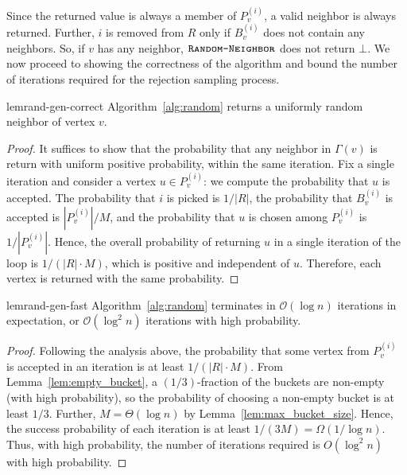 Since the returned value is always a member of $P_v^{(i)}$,
a valid neighbor is always returned.
Further, $i$ is removed from $R$ only if $B_v^{(i)}$ does not contain any neighbors.
So, if $v$ has any neighbor, $\texttt{\textsc{Random-Neighbor}}$ does not return $\bot$.
We now proceed to showing the correctness of the algorithm and bound the number of iterations required for the rejection sampling process.
\begin{restatable}{lem}{rand-gen-correct}
\label{lem:rand_gen_correct}
Algorithm~\ref{alg:random} returns a uniformly random neighbor of vertex $v$.
\end{restatable}
\begin{proof}
It suffices to show that the probability that any neighbor in $\Gamma(v)$ is return with uniform positive probability, within the same iteration.
Fix a single iteration and consider a vertex $u\in P_v^{(i)}$:
we compute the probability that $u$ is accepted.
The probability that $i$ is picked is $1/|R|$, the probability that $B_v^{(i)}$ is accepted is $|P_v^{(i)}|/M$, and the probability that $u$ is chosen among $P_v^{(i)}$ is $1/|P_v^{(i)}|$.
Hence, the overall probability of returning $u$ in a single iteration
of the loop is $1/(|R|\cdot M)$, which is positive and independent of $u$.
Therefore, each vertex is returned with the same probability.
\end{proof}

\begin{restatable}{lem}{rand-gen-fast}
\label{lem:rand_gen_fast}
Algorithm~\ref{alg:random} terminates in $\mathcal{O}(\log n)$ iterations in expectation, or $\mathcal{O}(\log^2 n)$ iterations with high probability.
\end{restatable}
\begin{proof}
Following the analysis above, the probability that some vertex from $P_v^{(i)}$ is accepted in an iteration is at least $1/(|R|\cdot M)$. From Lemma~\ref{lem:empty_bucket}, a $(1/3)$-fraction of the buckets are non-empty (with high probability), so the probability of choosing a non-empty bucket is at least $1/3$. Further, $M = \Theta(\log n)$ by Lemma~\ref{lem:max_bucket_size}. Hence, the success probability of each iteration is at least $1/(3M)=\Omega(1/\log n)$. Thus, with high probability, the number of iterations required is  $O(\log^2 n)$ with high probability.
\end{proof}






